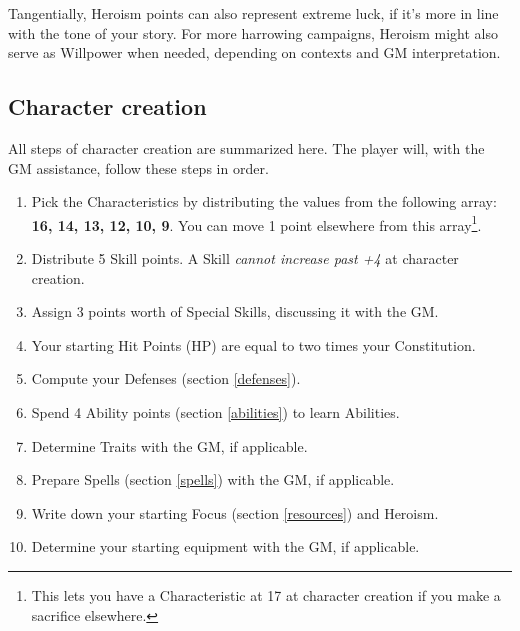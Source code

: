 Tangentially, Heroism points can also represent extreme luck, if it's more in line with the tone of your story. For more harrowing campaigns, Heroism might also serve as Willpower when needed, depending on contexts and GM interpretation.


\subsection{Character creation}
\label{character_creation}

All steps of character creation are summarized here. The player will, with the GM assistance, follow these steps in order.

\begin{enumerate}
    \item Pick the Characteristics by distributing the values from the following array: \textbf{16, 14, 13, 12, 10, 9}. You can move 1 point elsewhere from this array\footnote{This lets you have a Characteristic at 17 at character creation if you make a sacrifice elsewhere.}.
    \item Distribute 5 Skill points. A Skill \textit{cannot increase past +4} at character creation.
    \item Assign 3 points worth of Special Skills, discussing it with the GM.
    \item Your starting Hit Points (HP) are equal to two times your Constitution.
    \item Compute your Defenses (section \ref{defenses}).
	\item Spend 4 Ability points (section \ref{abilities}) to learn Abilities. 
    \item Determine Traits with the GM, if applicable.
    \item Prepare Spells (section \ref{spells}) with the GM, if applicable.
	\item Write down your starting Focus (section \ref{resources}) and Heroism.
    \item Determine your starting equipment with the GM, if applicable. 
\end{enumerate}